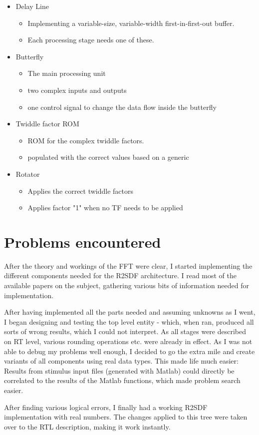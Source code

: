 \begin{itemize}
	\item Delay Line
	\begin{itemize}
		\item Implementing a variable-size, variable-width first-in-first-out buffer. 		\item Each processing stage needs one of these.
	\end{itemize}
	\item Butterfly
	\begin{itemize}
		\item The main processing unit
		\item two complex inputs and outputs
		\item one control signal to change the data flow inside the butterfly
	\end{itemize}
	\item Twiddle factor ROM
	\begin{itemize}
		\item ROM for the complex twiddle factors.
		\item populated with the correct values based on a generic 
	\end{itemize}
	\item Rotator
	\begin{itemize}
		\item Applies the correct twiddle factors
		\item Applies factor "1" when no TF needs to be applied
	\end{itemize}
\end{itemize}

\chapter{Problems encountered}
After the theory and workings of the FFT were clear, I started implementing the different components needed for the R2SDF architecture. I read most of the available papers on the subject, gathering various bits of information needed for implementation.

After having implemented all the parts needed and assuming unknowns as I went, I began designing and testing the top level entity - which, when ran, produced all sorts of wrong results, which I could not interpret. As all stages were described on RT level, various rounding operations etc. were already in effect. As I was not able to debug my problems well enough, I decided to go the extra mile and create variants of all components using real data types. This made life much easier: Results from stimulus input files (generated with Matlab) could directly be correlated to the results of the Matlab functions, which made problem search easier.

After finding various logical errors, I finally had a working R2SDF implementation with real numbers. The changes applied to this tree were taken over to the RTL description, making it work instantly.


